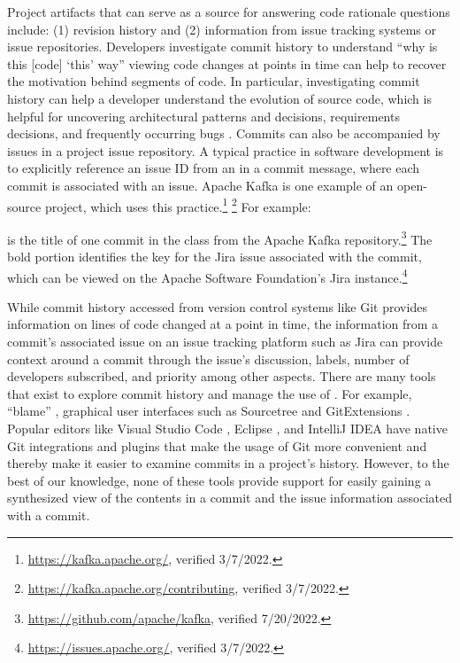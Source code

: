 Project artifacts that can serve as a source for answering code rationale questions include: 
(1) revision history and (2) information from issue tracking systems or issue repositories. 
Developers investigate commit history to understand ``why is this [code] ‘this’ way''  
viewing code changes at points in time can help to recover the motivation behind segments of code.
In particular, investigating commit history can help a developer understand the evolution of source code, 
which is helpful for uncovering architectural patterns and decisions, requirements decisions, 
and frequently occurring bugs \cite{codoban_software_2015}.
Commits can also be accompanied by issues in a project issue repository. 
A typical practice in software development is to explicitly reference an issue ID from an  
in a commit message, where each commit is associated with an issue. 
Apache Kafka is one example of an open-source project, which uses this practice.\footnote{\url{https://kafka.apache.org/}, verified 3/7/2022.} \footnote{\url{https://kafka.apache.org/contributing}, verified 3/7/2022.}
For example: 

\begin{center}
\end{center}

\noindent is the title of one commit in the  class from the Apache Kafka repository.\footnote{\url{https://github.com/apache/kafka}, verified 7/20/2022.}
The bold portion identifies the key for the Jira issue associated with the commit, 
which can be viewed on the Apache Software Foundation's Jira instance.\footnote{\url{https://issues.apache.org/}, verified 3/7/2022.}

While commit history accessed from version control systems like Git provides information on lines of code changed at a point in time, 
the information from a commit's associated issue on an issue tracking platform 
such as Jira \cite{jira} can provide context around a commit through the issue's discussion, labels, 
number of developers subscribed, and priority among other aspects.
There are many tools that exist to explore commit history and manage the use of . 
For example,  ``blame'' \cite{gitblame}, graphical user interfaces such as Sourcetree \cite{sourcetree} and GitExtensions \cite{gitextensions}. 
Popular editors like Visual Studio Code \cite{vscode}, Eclipse \cite{eclipse}, and IntelliJ IDEA \cite{intellij} have native Git integrations and plugins that make the usage of Git more convenient and thereby make it easier to examine commits in a project's history. 
However, to the best of our knowledge, none of these tools provide support for easily gaining a synthesized view of the contents in a commit and the issue information associated with a commit.


